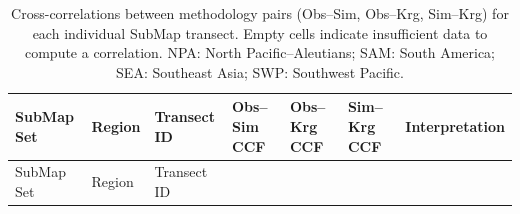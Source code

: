 \documentclass[final]{agujournal2019}
\begin{document}
\begin{longtable}[]{@{}
  >{\raggedright\arraybackslash}p{}
  >{\raggedleft\arraybackslash}p{}
  >{\raggedleft\arraybackslash}p{}
  >{\raggedleft\arraybackslash}p{}
  >{\raggedleft\arraybackslash}p{}
  >{\raggedleft\arraybackslash}p{}
  >{\raggedleft\arraybackslash}p{}@{}}
\caption{Cross-correlations between methodology pairs (Obs--Sim,
Obs--Krg, Sim--Krg) for each individual SubMap transect. Empty cells
indicate insufficient data to compute a correlation. NPA: North
Pacific--Aleutians; SAM: South America; SEA: Southeast Asia; SWP:
Southwest Pacific.}\label{tbl:method-ccf-summary}\tabularnewline
\toprule\noalign{}
\begin{minipage}[b]{\linewidth}\raggedright
SubMap Set
\end{minipage} & \begin{minipage}[b]{\linewidth}\raggedleft
Region
\end{minipage} & \begin{minipage}[b]{\linewidth}\raggedleft
Transect ID
\end{minipage} & \begin{minipage}[b]{\linewidth}\raggedleft
Obs--Sim CCF
\end{minipage} & \begin{minipage}[b]{\linewidth}\raggedleft
Obs--Krg CCF
\end{minipage} & \begin{minipage}[b]{\linewidth}\raggedleft
Sim--Krg CCF
\end{minipage} & \begin{minipage}[b]{\linewidth}\raggedleft
Interpretation
\end{minipage} \\
\midrule\noalign{}
\endfirsthead
\toprule\noalign{}
\begin{minipage}[b]{\linewidth}\raggedright
SubMap Set
\end{minipage} & \begin{minipage}[b]{\linewidth}\raggedleft
Region
\end{minipage} & \begin{minipage}[b]{\linewidth}\raggedleft
Transect ID
\end{minipage} & \begin{minipage}[b]{\linewidth}\raggedleft

\end{minipage}
\end{longtable}
\end{document}
